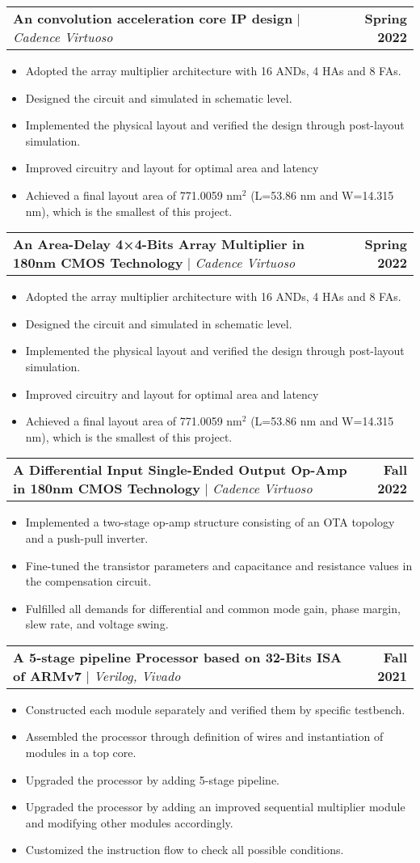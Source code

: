 \documentclass[letterpaper,11pt]{article}
\makeatletter
\newcommand{\resumeItem}[1]{
	\item\small{
		{#1 \vspace{-2pt}}
	}
}
\newcommand{\resumeProjectHeading}[2]{
	\item
	\begin{tabular*}{1.001\textwidth}{l@{\extracolsep{\fill}}r}
		\small#1 & \textbf{\small #2}\\
	\end{tabular*}\vspace{-7pt}
}
\newcommand{\resumeItemListStart}{\begin{itemize}}
\newcommand{\resumeItemListEnd}{\end{itemize}\vspace{-5pt}}
\makeatother
\begin{document}
	\resumeProjectHeading
	{\textbf{An convolution acceleration core IP design} $|$ \emph{Cadence Virtuoso}}{Spring 2022}
	\resumeItemListStart
	\resumeItem{Adopted the array multiplier architecture with 16 ANDs, 4 HAs and 8 FAs.}
	\resumeItem{Designed the circuit and simulated in schematic level.}
	\resumeItem{Implemented the physical layout and verified the design through post-layout simulation.}
	\resumeItem{Improved circuitry and layout for optimal area and latency}
	\resumeItem{Achieved a final layout area of 771.0059 nm$^{2}$ (L=53.86 nm and W=14.315 nm), which is the smallest of this project.}
	\resumeItemListEnd

	\resumeProjectHeading
	{\textbf{An Area-Delay 4×4-Bits Array Multiplier in 180nm CMOS Technology} $|$ \emph{Cadence Virtuoso}}{Spring 2022}
	\resumeItemListStart
	\resumeItem{Adopted the array multiplier architecture with 16 ANDs, 4 HAs and 8 FAs.}
	\resumeItem{Designed the circuit and simulated in schematic level.}
	\resumeItem{Implemented the physical layout and verified the design through post-layout simulation.}
	\resumeItem{Improved circuitry and layout for optimal area and latency}
	\resumeItem{Achieved a final layout area of 771.0059 nm$^{2}$ (L=53.86 nm and W=14.315 nm), which is the smallest of this project.}
	\resumeItemListEnd
	
	\vspace{-10pt}
	\resumeProjectHeading
	{\textbf{A Differential Input Single-Ended Output Op-Amp in 180nm CMOS Technology} $|$ \emph{Cadence Virtuoso}}{Fall 2022}
	\resumeItemListStart
	\resumeItem{Implemented a two-stage op-amp structure consisting of an OTA topology and a push-pull inverter.}
	\resumeItem{Fine-tuned the transistor parameters and capacitance and resistance values in the compensation circuit.}
	\resumeItem{Fulfilled all demands for differential and common mode gain, phase margin, slew rate, and voltage swing.}
	\resumeItemListEnd 
	
	
	
	\vspace{-10pt}
	\resumeProjectHeading
	{\textbf{A 5-stage pipeline Processor based on 32-Bits ISA of ARMv7} $|$ \emph{Verilog, Vivado}}{Fall 2021}
	\resumeItemListStart
	\resumeItem{Constructed each module separately and verified them by specific testbench.}
	\resumeItem{Assembled the processor through definition of wires and instantiation of modules in a top core.}
	\resumeItem{Upgraded the processor by adding 5-stage pipeline.}
	\resumeItem{Upgraded the processor by adding an improved sequential multiplier module and modifying other modules accordingly.}
	\resumeItem{Customized the instruction flow to check all possible conditions.}
	\resumeItemListEnd 
	
\end{document}
